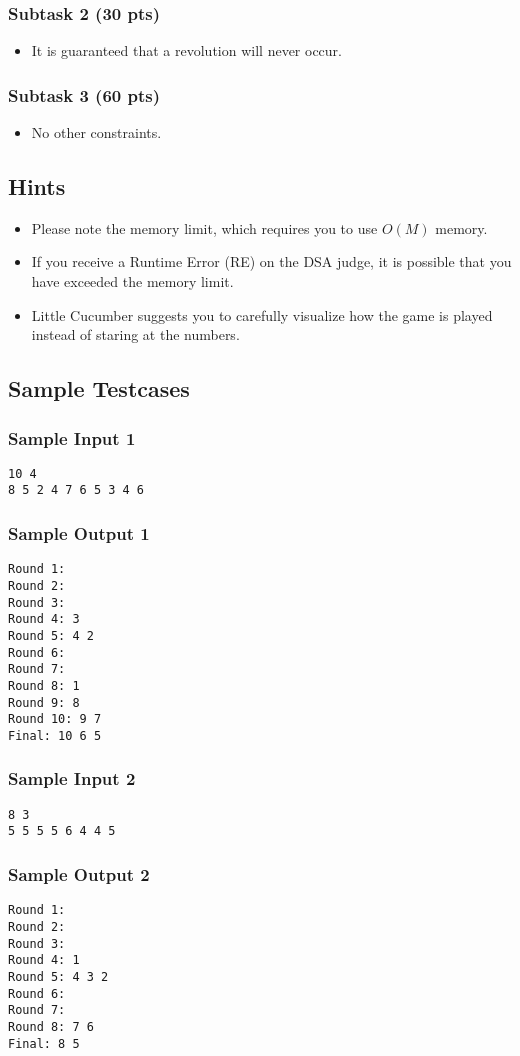 \subsubsection{Subtask 2 (30 pts)}\label{subtask-2}

\begin{itemize}
\tightlist
\item It is guaranteed that a revolution will never occur. 
\end{itemize}

\subsubsection{Subtask 3 (60 pts)}\label{subtask-3}

\begin{itemize}
\tightlist
\item No other constraints.
\end{itemize}

\subsection{Hints}
\begin{itemize}
    \item Please note the memory limit, which requires you to use $O(M)$ memory.
    \item If you receive a Runtime Error (RE) on the DSA judge, it is possible that you have exceeded the memory limit.
    \item Little Cucumber suggests you to carefully visualize how the game is played instead of staring at the numbers.
\end{itemize}

\subsection{Sample Testcases}

\subsubsection{Sample Input 1}\label{sample-input-1}
\begin{verbatim}
10 4
8 5 2 4 7 6 5 3 4 6
\end{verbatim}

\subsubsection{Sample Output 1}\label{sample-output-1}
\begin{verbatim}
Round 1:
Round 2:
Round 3:
Round 4: 3
Round 5: 4 2
Round 6:
Round 7:
Round 8: 1
Round 9: 8
Round 10: 9 7
Final: 10 6 5
\end{verbatim}

\subsubsection{Sample Input 2}\label{sample-input-2}
\begin{verbatim}
8 3
5 5 5 5 6 4 4 5
\end{verbatim}

\subsubsection{Sample Output 2}\label{sample-output-2}
\begin{verbatim}
Round 1:
Round 2:
Round 3:
Round 4: 1
Round 5: 4 3 2
Round 6:
Round 7:
Round 8: 7 6
Final: 8 5
\end{verbatim}